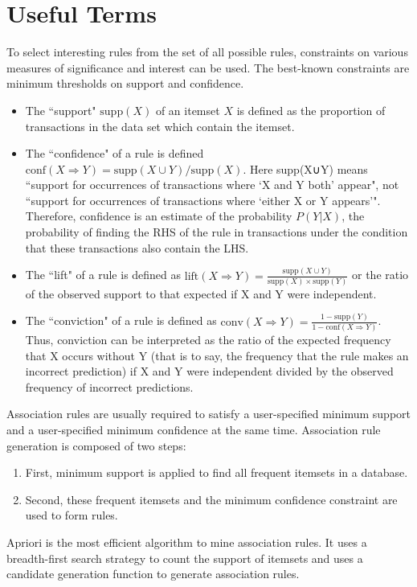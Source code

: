 \section{Useful Terms}
To select interesting rules from the set of all possible rules, constraints on various measures of significance and interest can be used. The best-known constraints are minimum thresholds on support and confidence.
	\begin{itemize}
		\item The ``support" \begin{math}\mathrm{supp}(X)\end{math} of an itemset \begin{math}X\end{math} is defined as the proportion of transactions in the data set which contain the itemset. 
		\item The ``confidence" of a rule is defined \begin{math}\mathrm{conf}(X\Rightarrow Y) = \mathrm{supp}(X \cup Y) / \mathrm{supp}(X)\end{math}. Here supp(X∪Y) means ``support for occurrences of transactions where `X and Y both' appear", not ``support for occurrences of transactions where `either X or Y appears'". Therefore, confidence is an estimate of the probability \begin{math}P(Y|X)\end{math}, the probability of finding the RHS of the rule in transactions under the condition that these transactions also contain the LHS.
		\item The ``lift" of a rule is defined as \begin{math} \mathrm{lift}(X\Rightarrow Y) = \frac{ \mathrm{supp}(X \cup Y)}{ \mathrm{supp}(X) \times \mathrm{supp}(Y) } \end{math} or the ratio of the observed support to that expected if X and Y were independent. 
		\item The ``conviction" of a rule is defined as \begin{math} \mathrm{conv}(X\Rightarrow Y) =\frac{ 1 - \mathrm{supp}(Y) }{ 1 - \mathrm{conf}(X\Rightarrow Y)}\end{math}. Thus, conviction can be interpreted as the ratio of the expected frequency that X occurs without Y (that is to say, the frequency that the rule makes an incorrect prediction) if X and Y were independent divided by the observed frequency of incorrect predictions.
	\end{itemize}
Association rules are usually required to satisfy a user-specified minimum support and a user-specified minimum confidence at the same time. Association rule generation is composed of two steps:
	\begin{enumerate}
		\item First, minimum support is applied to find all frequent itemsets in a database. 
		\item Second, these frequent itemsets and the minimum confidence constraint are used to form rules.
	\end{enumerate}
Apriori is the most efficient algorithm to mine association rules. It uses a breadth-first search strategy to count the support of itemsets and uses a candidate generation function to generate association rules.
